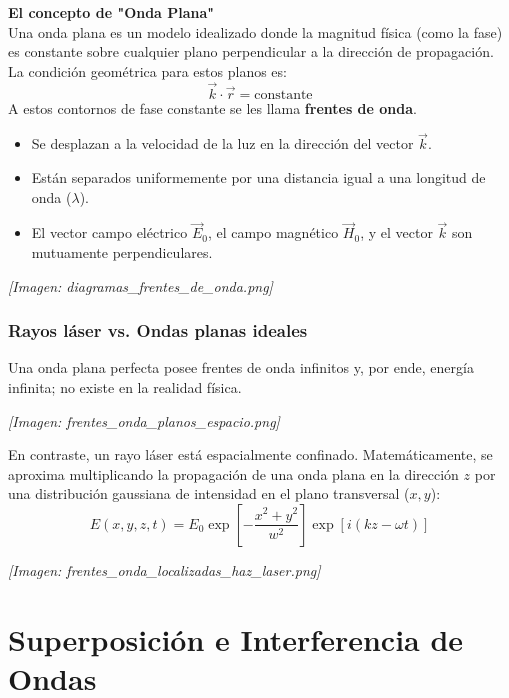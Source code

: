 \documentclass[12pt]{article}
\begin{document}
	\vspace{0.5cm}
	\textbf{El concepto de "Onda Plana"}\\
	Una onda plana es un modelo idealizado donde la magnitud física (como la fase) es constante sobre cualquier plano perpendicular a la dirección de propagación. La condición geométrica para estos planos es:
	\begin{equation*}
		\vec{k}\cdot\vec{r} = \text{constante}
	\end{equation*}
	A estos contornos de fase constante se les llama \textbf{frentes de onda}.
	
	\begin{itemize}
		\item Se desplazan a la velocidad de la luz en la dirección del vector $\vec{k}$.
		\item Están separados uniformemente por una distancia igual a una longitud de onda ($\lambda$).
		\item El vector campo eléctrico $\vec{E}_0$, el campo magnético $\vec{H}_0$, y el vector $\vec{k}$ son mutuamente perpendiculares.
	\end{itemize}
	
	\textit{[Imagen: diagramas\_frentes\_de\_onda.png]}
	
	\subsubsection*{Rayos láser vs. Ondas planas ideales}
	Una onda plana perfecta posee frentes de onda infinitos y, por ende, energía infinita; no existe en la realidad física.
	
	\textit{[Imagen: frentes\_onda\_planos\_espacio.png]}
	
	En contraste, un rayo láser está espacialmente confinado. Matemáticamente, se aproxima multiplicando la propagación de una onda plana en la dirección $z$ por una distribución gaussiana de intensidad en el plano transversal ($x,y$):
	\begin{equation*}
		E(x,y,z,t) = E_0 \exp\left[-\frac{x^2+y^2}{w^2}\right] \exp[i(kz - \omega t)]
	\end{equation*}
	
	\textit{[Imagen: frentes\_onda\_localizadas\_haz\_laser.png]}
	
	\section{Superposición e Interferencia de Ondas}
	
\end{document}
